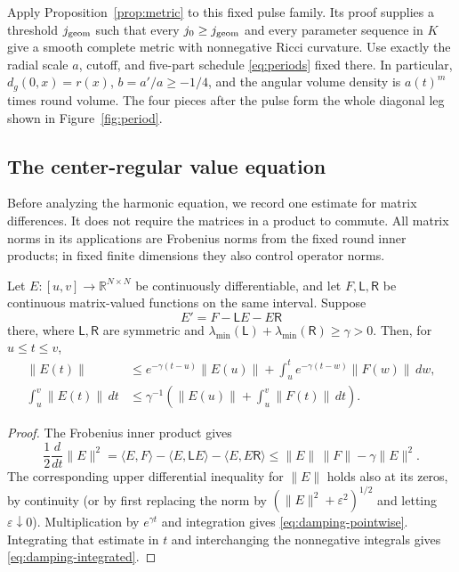 Apply Proposition~\ref{prop:metric} to this fixed pulse family. Its proof
supplies a threshold \(j_{\rm geom}\) such that every \(j_0\geq j_{\rm geom}\)
and every parameter sequence in \(K\) give a smooth complete metric with
nonnegative Ricci curvature. Use exactly the radial scale \(a\), cutoff,
and five-part schedule \eqref{eq:periods} fixed there. In particular,
\(d_g(0,x)=r(x)\), \(b=a'/a\geq-1/4\), and the angular volume density is
\(a(t)^m\) times round volume. The four pieces after the pulse form the
whole diagonal leg shown in Figure~\ref{fig:period}.

\subsection{The center-regular value equation}
Before analyzing the harmonic equation, we record one estimate
for matrix differences.  It does not require the matrices in a
product to commute.  All matrix norms in its applications are
Frobenius norms from the fixed round inner products; in fixed
finite dimensions they also control operator norms.

\begin{lemma}
\label{lem:damping}
Let \(E:[u,v]\to\mathbb R^{N\times N}\) be continuously
differentiable, and let \(F,\mathsf L,\mathsf R\) be continuous
matrix-valued functions on the same interval.  Suppose
\[
 E'=F-\mathsf L E-E\mathsf R
\]
there, where \(\mathsf L,\mathsf R\) are
symmetric and
\(\lambda_{\min}(\mathsf L)+\lambda_{\min}(\mathsf R)\geq\gamma>0\).
Then, for \(u\leq t\leq v\),
\begin{align}
 \|E(t)\|&\leq e^{-\gamma(t-u)}\|E(u)\|
       +\int_u^t e^{-\gamma(t-w)}\|F(w)\|\,dw,
       \label{eq:damping-pointwise}\\
 \int_u^v\|E(t)\|\,dt
 &\leq\gamma^{-1}
       \left(\|E(u)\|+\int_u^v\|F(t)\|\,dt\right).
       \label{eq:damping-integrated}
\end{align}
\end{lemma}

\begin{proof}
The Frobenius inner product gives
\[
 \frac12\frac{d}{dt}\|E\|^2
 =\langle E,F\rangle-\langle E,\mathsf L E\rangle
                         -\langle E,E\mathsf R\rangle
 \leq \|E\|\,\|F\|-\gamma\|E\|^2.
\]
The corresponding upper differential inequality for \(\|E\|\)
holds also at its zeros, by continuity (or by first replacing the
norm by \((\|E\|^2+\varepsilon^2)^{1/2}\) and letting
\(\varepsilon\downarrow0\)).  Multiplication by \(e^{\gamma t}\)
and integration gives \eqref{eq:damping-pointwise}.  Integrating
that estimate in \(t\) and interchanging the nonnegative integrals
gives \eqref{eq:damping-integrated}.
\end{proof}

